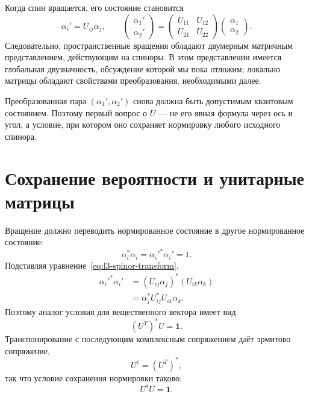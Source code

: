 Когда спин вращается, его состояние становится
\begin{equation}
\alpha_i'=U_{ij}\alpha_j,
\qquad
\begin{pmatrix}\alpha_1'\\\alpha_2'\end{pmatrix}
=
\begin{pmatrix}
U_{11}&U_{12}\\
U_{21}&U_{22}
\end{pmatrix}
\begin{pmatrix}\alpha_1\\\alpha_2\end{pmatrix}.
\label{eq:l3-spinor-transform}
\end{equation}
Следовательно, пространственные вращения обладают двумерным матричным представлением, действующим на спиноры. В этом представлении имеется глобальная двузначность, обсуждение которой мы пока отложим; локально матрицы обладают свойствами преобразования, необходимыми далее.

Преобразованная пара \((\alpha_1',\alpha_2')\) снова должна быть допустимым квантовым состоянием. Поэтому первый вопрос о \(U\) — не его явная формула через ось и угол, а условие, при котором оно сохраняет нормировку любого исходного спинора.

\section{Сохранение вероятности и унитарные матрицы}

Вращение должно переводить нормированное состояние в другое нормированное состояние:
\begin{equation}
\alpha_i^*\alpha_i=\alpha_i'^*\alpha_i'=1.
\end{equation}
Подставляя уравнение~\eqref{eq:l3-spinor-transform},
\begin{align}
\alpha_i'^*\alpha_i'
 &=(U_{ij}\alpha_j)^*(U_{ik}\alpha_k)\\
 &=\alpha_j^*U_{ij}^*U_{ik}\alpha_k.
\end{align}
Поэтому аналог условия для вещественного вектора имеет вид
\begin{equation}
(U^T)^*U=\boldsymbol 1.
\end{equation}
Транспонирование с последующим комплексным сопряжением даёт эрмитово сопряжение,
\begin{equation}
U^\dagger=(U^T)^*,
\end{equation}
так что условие сохранения нормировки таково:
\begin{equation}
U^\dagger U=\boldsymbol 1.
\label{eq:l3-unitarity}
\end{equation}

